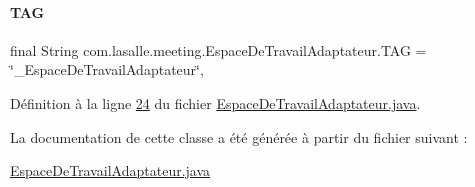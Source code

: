 \paragraph{\texorpdfstring{T\+AG}{TAG}}
{\footnotesize\ttfamily final String com.\+lasalle.\+meeting.\+Espace\+De\+Travail\+Adaptateur.\+T\+AG = \char`\"{}\+\_\+\+Espace\+De\+Travail\+Adaptateur\char`\"{}\hspace{0.3cm}{\ttfamily [static]}, {\ttfamily [private]}}



Définition à la ligne \hyperlink{_espace_de_travail_adaptateur_8java_source_l00024}{24} du fichier \hyperlink{_espace_de_travail_adaptateur_8java_source}{Espace\+De\+Travail\+Adaptateur.\+java}.



La documentation de cette classe a été générée à partir du fichier suivant \+:\begin{DoxyCompactItemize}
\item 
\hyperlink{_espace_de_travail_adaptateur_8java}{Espace\+De\+Travail\+Adaptateur.\+java}\end{DoxyCompactItemize}
